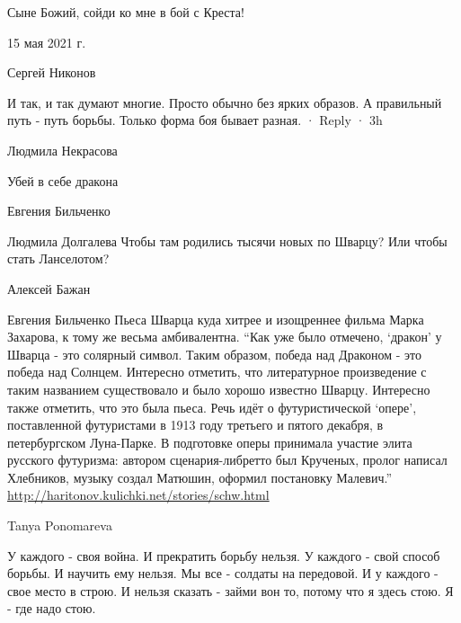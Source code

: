 Сыне Божий, сойди ко мне в бой с Креста!

15 мая 2021 г.

Сергей Никонов

И так, и так думают многие. Просто обычно без ярких образов. А правильный путь
- путь борьбы. Только форма боя бывает разная.  · Reply · 3h

Людмила Некрасова

Убей в себе дракона

Евгения Бильченко

Людмила Долгалева Чтобы там родились тысячи новых по Шварцу? Или чтобы стать Ланселотом?

Алексей Бажан

Евгения Бильченко Пьеса Шварца куда хитрее и изощреннее фильма Марка Захарова,
к тому же весьма амбивалентна. \enquote{Как уже было отмечено, \enquote{дракон} у Шварца - это
солярный символ. Таким образом, победа над Драконом - это победа над Солнцем.
Интересно отметить, что литературное произведение с таким названием
существовало и было хорошо известно Шварцу. Интересно также отметить, что это
была пьеса.  Речь идёт о футуристической \enquote{опере}, поставленной футуристами в
1913 году третьего и пятого декабря, в петербургском Луна-Парке. В подготовке
оперы принимала участие элита русского футуризма: автором сценария-либретто был
Крученых, пролог написал Хлебников, музыку создал Матюшин, оформил постановку
Малевич.} \url{http://haritonov.kulichki.net/stories/schw.html}

Tanya Ponomareva

У каждого - своя война. И прекратить борьбу нельзя. У каждого - свой способ
борьбы. И научить ему нельзя. Мы все - солдаты на передовой. И у каждого - свое
место в строю. И нельзя сказать - займи вон то, потому что я здесь стою. Я -
где надо стою.
